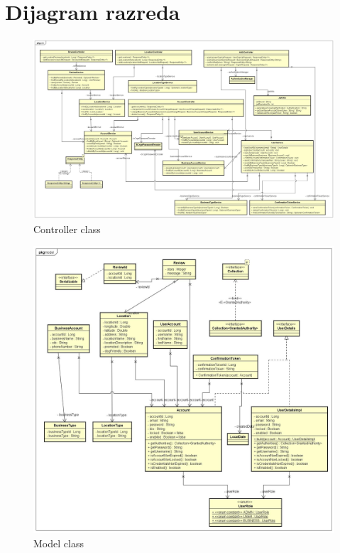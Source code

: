     \section{Dijagram razreda}
        \begin{figure}[H]
        	\includegraphics[width=\textwidth]{img/Dijagrami razreda/Controller_Class_Dijagram.jpg}
        	\centering
        	\caption{Controller class}
        	\label{fig:promjene}
        \end{figure}
        \begin{figure}[H]
        	\includegraphics[width=\textwidth]{img/Dijagrami razreda/Model_Class_Dijagram.jpg}
        	\centering
        	\caption{Model class}
        	\label{fig:promjene}
        \end{figure}
